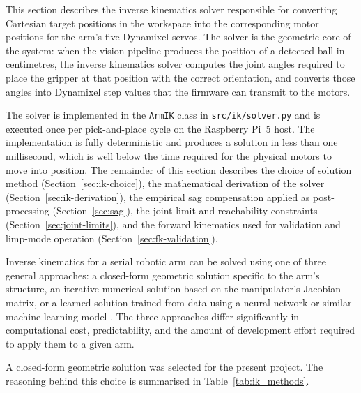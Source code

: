 \label{sec:ik-solver}

This section describes the inverse kinematics solver responsible for 
converting Cartesian target positions in the workspace into the 
corresponding motor positions for the arm's five Dynamixel servos. 
The solver is the geometric core of the system: when the vision 
pipeline produces the position of a detected ball in centimetres, 
the inverse kinematics solver computes the joint angles required to 
place the gripper at that position with the correct orientation, 
and converts those angles into Dynamixel step values that the 
firmware can transmit to the motors.

The solver is implemented in the \texttt{ArmIK} class in 
\texttt{src/ik/solver.py} and is executed once per pick-and-place 
cycle on the Raspberry Pi~5 host. The implementation is fully 
deterministic and produces a solution in less than one millisecond, 
which is well below the time required for the physical motors to 
move into position. The remainder of this section describes the 
choice of solution method (Section~\ref{sec:ik-choice}), the mathematical 
derivation of the solver (Section~\ref{sec:ik-derivation}), the empirical sag 
compensation applied as post-processing (Section~\ref{sec:sag}), the 
joint limit and reachability constraints (Section~\ref{sec:joint-limits}), and 
the forward kinematics used for validation and limp-mode 
operation (Section~\ref{sec:fk-validation}).

\label{sec:ik-choice}

Inverse kinematics for a serial robotic arm can be solved using one 
of three general approaches: a closed-form geometric solution 
specific to the arm's structure, an iterative numerical solution 
based on the manipulator's Jacobian matrix, or a learned solution 
trained from data using a neural network or similar machine 
learning model \cite{craig2005}. The three approaches differ 
significantly in computational cost, predictability, and the 
amount of development effort required to apply them to a given arm.

A closed-form geometric solution was selected for the present 
project. The reasoning behind this choice is summarised in 
Table~\ref{tab:ik_methods}.

